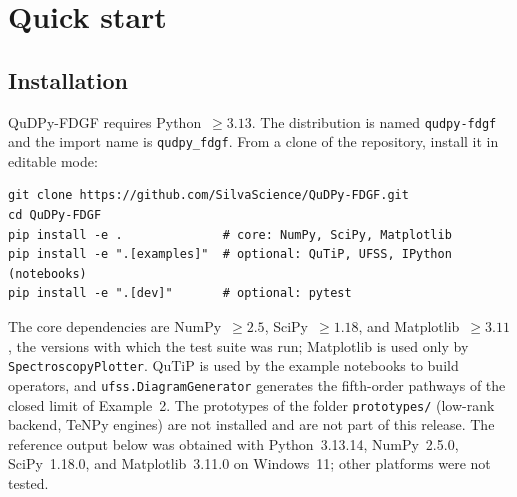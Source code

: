 \documentclass[11pt]{article}
\begin{document}
\section{Quick start}
\label{sec:quick-start}

\subsection{Installation}
QuDPy-FDGF requires Python~$\geq 3.13$. The distribution is named \texttt{qudpy-fdgf} and the import name is \texttt{qudpy\_fdgf}. From a clone of the repository, install it in editable mode:
\begin{verbatim}
git clone https://github.com/SilvaScience/QuDPy-FDGF.git
cd QuDPy-FDGF
pip install -e .              # core: NumPy, SciPy, Matplotlib
pip install -e ".[examples]"  # optional: QuTiP, UFSS, IPython (notebooks)
pip install -e ".[dev]"       # optional: pytest
\end{verbatim}
The core dependencies are NumPy~$\geq 2.5$, SciPy~$\geq 1.18$, and Matplotlib~$\geq 3.11$, the versions with which the test suite was run; Matplotlib is used only by \texttt{SpectroscopyPlotter}. QuTiP is used by the example notebooks to build operators, and \texttt{ufss.DiagramGenerator} generates the fifth-order pathways of the closed limit of Example~2. The prototypes of the folder \texttt{prototypes/} (low-rank backend, TeNPy engines) are not installed and are not part of this release. The reference output below was obtained with Python~3.13.14, NumPy~2.5.0, SciPy~1.18.0, and Matplotlib~3.11.0 on Windows~11; other platforms were not tested.
\end{document}
